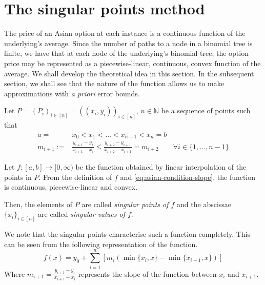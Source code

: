 \section{The singular points method}
\label{sec:asian-method}

The price of an Asian option at each instance is a continuous function of the underlying's average. Since the number of paths to a node in a binomial tree is finite, we have that at each node of the underlying's binomial tree, the option price may be represented as a piecewise-linear, continuous, convex function of the average. We shall develop the theoretical idea in this section. In the subsequent section, we shall see that the nature of the function allows us to make approximations with \emph{a priori} error bounds.


\begin{dfn} \label{def:asian-sp}
	Let $ P = (P_i)_{i \in [n]} = ( (x_i, y_i) )_{i \in [n]} $, $ n \in \mathbb{N} $ be a sequence of points such that
	\begin{subequations} \label{eq:asian-conditions}
		\begin{align}
			a =& x_0 < x_1 < \dots < x_{n-1} < x_n = b \\
			\label{eq:asian-condition-slope}
			m_{i+1} :=& \frac{y_{i+1} - y_{i}}{x_{i+1} - x_{i}} \le \frac{y_{i+2} - y_{i+1}}{x_{i+2} - x_{i+1}} = m_{i+2} \qquad \forall i \in \{ 1, \dots, n-1 \}
		\end{align}
	\end{subequations}
	
	Let $ f:[a,b] \to [0, \infty) $ be the function obtained by linear interpolation of the points in $P$. From the definition of $f$ and	 \ref{eq:asian-condition-slope}, the function is continuous, piecewise-linear and convex.
	
	Then, the elements of $P$ are called \emph{singular points of $f$} and the abscissae $ \{ x_i \}_{i \in [n]} $ are called \emph{singular values of $f$}.
\end{dfn}


\begin{rem}
	\label{rem:asian-char}
	We note that the singular points characterise such a function completely. This can be seen from the following representation of the function.
	\begin{equation}
		\label{eq:asian-function-repr}
		f(x) = y_0 + \sum_{i=1}^n [ m_i ( \min \{x_{i}, x \} - \min \{ x_{i-1}, x \} ) ]
	\end{equation}
	Where $ m_{i+1} = \frac{y_{i+1} - y_{i}}{x_{i+1} - x_{i}} $ represents the slope of the function between $ x_{i} $ and $ x_{i+1} $.
\end{rem}

